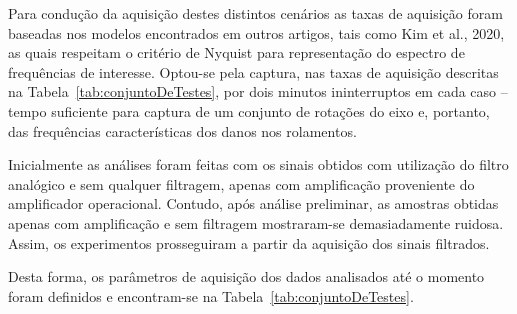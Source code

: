 \documentclass[
	12pt,				
	oneside,			
	a4paper,			
	english,			
	brazil,			
	]{abntex2ppgsi}
\begin{document}

Para condução da aquisição destes distintos cenários as taxas de aquisição foram baseadas nos modelos encontrados em outros artigos, tais como Kim et al., 2020, as quais respeitam o critério de Nyquist para representação do espectro de frequências de interesse. Optou-se pela captura, nas taxas de aquisição descritas na Tabela~\ref{tab:conjuntoDeTestes}, por dois minutos ininterruptos em cada caso – tempo suficiente para captura de um conjunto de rotações do eixo e, portanto, das frequências características dos danos nos rolamentos. 

Inicialmente as análises foram feitas com os sinais obtidos com utilização do filtro analógico e sem qualquer filtragem, apenas com amplificação proveniente do amplificador operacional. Contudo, após análise preliminar, as amostras obtidas apenas com amplificação e sem filtragem mostraram-se demasiadamente ruidosa. Assim, os experimentos prosseguiram a partir da aquisição dos sinais filtrados.

Desta forma, os parâmetros de aquisição dos dados analisados até o momento foram definidos e encontram-se na Tabela~\ref{tab:conjuntoDeTestes}.
\end{document}
